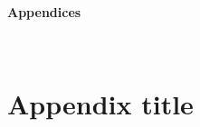 \documentclass[12pt,a4paper,twoside,openany,justified]{book}
\begin{document}
\thispagestyle{empty}




\begin{spacing}{1.3}
\thispagestyle{toc}
\tableofcontents
\clearpage
\end{spacing}



\pagestyle{fancy}
\justifying
















{
\begin{LARGE}
\textbf{Appendices}
\end{LARGE}\\
\noappendicestocpagenum
\renewcommand{\appendixtocname}{Appendix}
\renewcommand{\appendixpagename}{Appendix}
\appendix
\addappheadtotoc
\chapter{Appendix title}
\label{appendix:first-appendix}
\normalsize
}
\appendix



\normalsize\printbibliography[title={Bibliography}]
 


\end{document}
